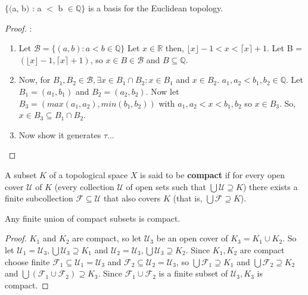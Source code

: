 \documentclass{article}
\begin{document}
	\begin{theorem}
	$\lbrace($a, b$)$ : a $<$ b $\in \mathbb{Q}\rbrace$ is a basis for the Euclidean topology.
	\end{theorem}
	\begin{proof}:\newline
		\begin{enumerate}
		\item Let $\mathcal{B} = \lbrace (a, b) : a < b \in \mathbb{Q}\rbrace$ Let $x \in \mathbb{R}$ then, $\lfloor x \rfloor -1 < x < \lceil x \rceil + 1$. Let B = $(\lfloor x \rfloor -1, \lceil x \rceil + 1)$, so $x \in B \in \mathcal{B}$ and $B \subseteq \mathbb{Q}$.
		\item Now, for $B_1, B_2 \in \mathcal{B}, \exists x \in B_1 \cap B_2 : x \in B_1$ and $x \in B_2$. $a_1, a_2 < b_1, b_2 \in \mathbb{Q}.$ Let $B_1 = (a_1, b_1)$ and $B_2 = (a_2, b_2)$. Now let $B_3 = (max(a_1,a_2), min(b_1,b_2))$ with $a_1,a_2<x<b_1,b_2$ so $x \in B_3$. So, $x \in B_3 \subseteq B_1 \cap B_2$.
		\item Now show it generates $\tau$...
		\end{enumerate} 
	\end{proof}

	\begin{definition}
	  A subset \(K\) of a topological space \(X\) is said to be \textbf{compact} if for every
	  open cover \(\mathcal U\) of \(K\) (every collection \(\mathcal U\) of open sets
	  such that \(\bigcup \mathcal U\supseteq K\)) there exists a finite subcollection
	  \(\mathcal F\subseteq \mathcal U\) that also covers \(K\) (that is,
	  \(\bigcup\mathcal F\supseteq K\)).
	\end{definition}

	\begin{theorem}
	  Any finite union of compact subsets is compact.
	\end{theorem}

	\begin{proof}
	$K_1$ and $K_2$ are compact, so let $\mathcal{U}_3$ be an open cover of $K_3 = K_1 \cup K_2$. So let $\mathcal{U}_1 = \mathcal{U}_3, \bigcup \mathcal{U}_3 \supseteq K_1$ and $\mathcal{U}_2 = \mathcal{U}_3, \bigcup \mathcal{U}_3 \supseteq K_2$. Since $K_1, K_2$ are compact choose finite $\mathcal{F}_1 \subseteq \mathcal{U}_1 = \mathcal{U}_3$ and $\mathcal{F}_2 \subseteq \mathcal{U}_2 = \mathcal{U}_3$, so $\bigcup \mathcal{F}_1 \supseteq K_1$ and $\bigcup \mathcal{F}_2 \supseteq K_2$ and $\bigcup (\mathcal{F}_1 \cup \mathcal{F}_2) \supseteq K_3$. Since $\mathcal{F}_1 \cup \mathcal{F}_2$ is a finite subset of $\mathcal{U}_3, K_3$ is compact.
	\end{proof}
\end{document}

